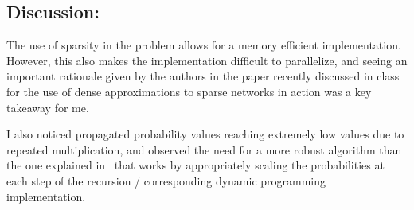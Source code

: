 \documentclass[5pt]{article}
\begin{document}
\subsection{Discussion:}
The use of sparsity in the problem allows for a memory efficient
implementation. However, this also makes the implementation difficult to
parallelize, and seeing an important rationale given by the authors in the
paper recently discussed in class~\cite{szegedy2015going} for the use of dense
approximations to sparse networks in action was a key takeaway for me.

I also noticed propagated probability values reaching extremely low values due
to repeated multiplication, and observed the need for a more robust algorithm
than the one explained in~\cite{rabiner1986tutorial} that works by
appropriately scaling the probabilities at each step of the recursion /
corresponding dynamic programming implementation.

\medskip


\end{document}
